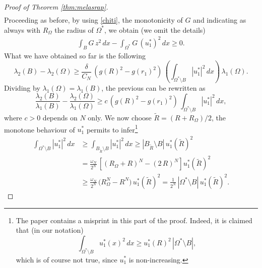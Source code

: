 \documentclass{amsart}
\theoremstyle{definition}
\numberwithin{equation}{section}
\begin{document}
\begin{proof}[Proof of Theorem \ref{thm:melasrap}]
\[\begin{split}
\end{split}
\]
Proceeding as before, by using \eqref{chiti}, the monotonicity of $G$ and indicating as always with $R_\Omega$ the radius of $\Omega^*$, we obtain (we omit the details)
\[
\begin{split}
\int_B G\, z^2\, dx-\int_{\Omega^*} G\, (u^*_1)^2\, dx\ge 0. %
\end{split}
\]
What we have obtained so far is the following
\[
\lambda_2(B)-\lambda_2(\Omega)\ge \frac{\delta}{C_N}\, \left(g(R)^2-g(r_1)^2\right)\,\left(\int_{\Omega^*\setminus B} |u^*_1|^2 \, dx\right)\,\lambda_1(\Omega).
\]
Dividing by $\lambda_1(\Omega)=\lambda_1(B)$, the previous can be rewritten as
\begin{equation}
\label{stabile?}
\frac{\lambda_2(B)}{\lambda_1(B)}-\frac{\lambda_2(\Omega)}{\lambda_1(\Omega)}\ge c\,\left(g(R)^2-g(r_1)^2\right)\,\int_{\Omega^*\setminus B} |u^*_1|^2 \, dx,
\end{equation}
where $c>0$ depends on $N$ only.
We now choose $\widetilde R=(R+R_\Omega)/2$, the monotone behaviour of $u^*_1$ permits to infer\footnote{The paper \cite{MR1168980} contains a misprint in this part of the proof. Indeed, it is claimed that (in our notation)
\[
\int_{\Omega^*\setminus B} u^*_1(x)^2 \, dx\ge u^*_1(R)^2\,|\Omega^*\setminus B|,
\]
which is of course not true, since $u_1^*$ is non-increasing.}
\[
\begin{split}
\int_{\Omega^*\setminus B} |u^*_1|^2 \, dx&\ge \int_{B_{\widetilde R}\setminus B} |u^*_1|^2\, dx\ge |B_{\widetilde R}\setminus B|\, u_1^*(\widetilde R)^2\\
&= \frac{\omega_N}{2^N}\,\left[(R_\Omega+R)^N-(2\,R)^N\right] u_1^*(\widetilde R)^2\\
&\ge \frac{\omega_N}{2^N}\,\Big(R_\Omega^N-R^N\Big)\,u_1^*(\widetilde R)^2= \frac{1}{2^N}\, |\Omega^*\setminus B|\,u_1^*(\widetilde R)^2.

\end{split}\]
\end{proof}
\end{document}
